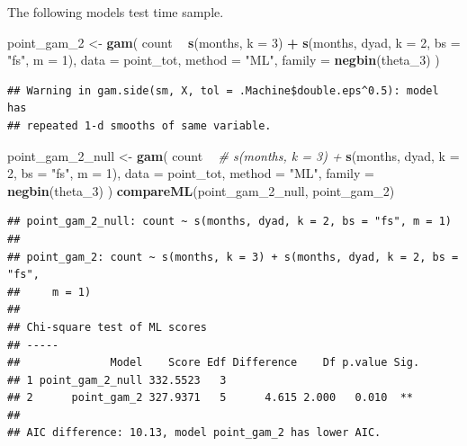 \documentclass[]{article}
\newenvironment{Shaded}{\begin{snugshade}}{\end{snugshade}}
\newcommand{\CommentTok}[1]{\textcolor[rgb]{0.56,0.35,0.01}{\textit{#1}}}
\newcommand{\DataTypeTok}[1]{\textcolor[rgb]{0.13,0.29,0.53}{#1}}
\newcommand{\DecValTok}[1]{\textcolor[rgb]{0.00,0.00,0.81}{#1}}
\newcommand{\KeywordTok}[1]{\textcolor[rgb]{0.13,0.29,0.53}{\textbf{#1}}}
\newcommand{\NormalTok}[1]{#1}
\newcommand{\OperatorTok}[1]{\textcolor[rgb]{0.81,0.36,0.00}{\textbf{#1}}}
\newcommand{\StringTok}[1]{\textcolor[rgb]{0.31,0.60,0.02}{#1}}
\begin{document}
The following models test time sample.

\begin{Shaded}
\begin{Highlighting}[]
\NormalTok{point_gam_}\DecValTok{2}\NormalTok{ <-}\StringTok{ }\KeywordTok{gam}\NormalTok{(}
\NormalTok{  count }\OperatorTok{~}
\StringTok{    }\KeywordTok{s}\NormalTok{(months, }\DataTypeTok{k =} \DecValTok{3}\NormalTok{) }\OperatorTok{+}
\StringTok{    }\KeywordTok{s}\NormalTok{(months, dyad, }\DataTypeTok{k =} \DecValTok{2}\NormalTok{, }\DataTypeTok{bs =} \StringTok{"fs"}\NormalTok{, }\DataTypeTok{m =} \DecValTok{1}\NormalTok{),}
  \DataTypeTok{data =}\NormalTok{ point_tot,}
  \DataTypeTok{method =} \StringTok{"ML"}\NormalTok{,}
  \DataTypeTok{family =} \KeywordTok{negbin}\NormalTok{(theta_}\DecValTok{3}\NormalTok{)}
\NormalTok{)}
\end{Highlighting}
\end{Shaded}

\begin{verbatim}
## Warning in gam.side(sm, X, tol = .Machine$double.eps^0.5): model has
## repeated 1-d smooths of same variable.
\end{verbatim}

\begin{Shaded}
\begin{Highlighting}[]
\NormalTok{point_gam_}\DecValTok{2}\NormalTok{_null <-}\StringTok{ }\KeywordTok{gam}\NormalTok{(}
\NormalTok{  count }\OperatorTok{~}
\StringTok{    }\CommentTok{# s(months, k = 3) +}
\StringTok{    }\KeywordTok{s}\NormalTok{(months, dyad, }\DataTypeTok{k =} \DecValTok{2}\NormalTok{, }\DataTypeTok{bs =} \StringTok{"fs"}\NormalTok{, }\DataTypeTok{m =} \DecValTok{1}\NormalTok{),}
  \DataTypeTok{data =}\NormalTok{ point_tot,}
  \DataTypeTok{method =} \StringTok{"ML"}\NormalTok{,}
  \DataTypeTok{family =} \KeywordTok{negbin}\NormalTok{(theta_}\DecValTok{3}\NormalTok{)}
\NormalTok{)}
\KeywordTok{compareML}\NormalTok{(point_gam_}\DecValTok{2}\NormalTok{_null, point_gam_}\DecValTok{2}\NormalTok{)}
\end{Highlighting}
\end{Shaded}

\begin{verbatim}
## point_gam_2_null: count ~ s(months, dyad, k = 2, bs = "fs", m = 1)
## 
## point_gam_2: count ~ s(months, k = 3) + s(months, dyad, k = 2, bs = "fs", 
##     m = 1)
## 
## Chi-square test of ML scores
## -----
##              Model    Score Edf Difference    Df p.value Sig.
## 1 point_gam_2_null 332.5523   3                              
## 2      point_gam_2 327.9371   5      4.615 2.000   0.010  ** 
## 
## AIC difference: 10.13, model point_gam_2 has lower AIC.
\end{verbatim}
\end{document}
